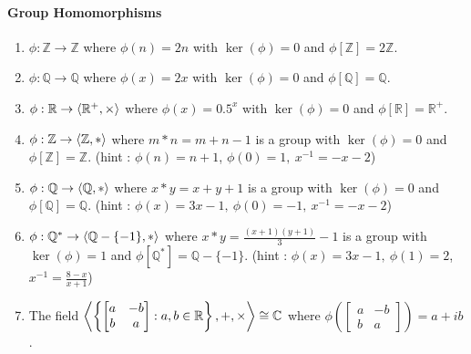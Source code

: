 \paragraph{Group Homomorphisms}
\begin{enumerate}
	\item $\phi : \mathbb{Z} \to \mathbb{Z}$ where $\phi(n)=2n$ with $\ker(\phi) = 0$ and $\phi[\mathbb{Z}] = 2\mathbb{Z}$.
	\item $\phi : \mathbb{Q} \to \mathbb{Q}$ where $\phi(x)=2x$ with $\ker(\phi) = 0$ and $\phi[\mathbb{Q}] = \mathbb{Q}$.
	\item $\phi : \mathbb{R} \to \left\langle \mathbb{R}^+,\times \right\rangle$ where $\phi(x)=0.5^x$ with $\ker(\phi) = 0$ and $\phi[\mathbb{R}] = \mathbb{R}^+$.
	\item $\phi : \mathbb{Z} \to \left\langle \mathbb{Z},\ast \right\rangle$ where $m \ast n = m+n-1 $ is a group with $\ker(\phi) = 0$ and $\phi[\mathbb{Z}] = \mathbb{Z}$.
		(hint : $\phi(n) = n+1$, $\phi(0) = 1,\ x^{-1} = -x-2$)
	\item $\phi : \mathbb{Q} \to \left\langle \mathbb{Q},\ast \right\rangle$ where $x \ast y =  x+y+1$ is a group with $\ker(\phi) = 0$ and $\phi[\mathbb{Q}] = \mathbb{Q}$.
		(hint : $\phi(x) = 3x-1,\ \phi(0) = -1,\ x^{-1} = -x-2$)
	\item $\phi : \mathbb{Q}^\ast \to \left\langle \mathbb{Q}-\{-1\},\ast \right\rangle$ where $x \ast y =  \frac{(x+1)(y+1)}{3}-1$ is a group with $\ker(\phi) = 1$ and $\phi[\mathbb{Q}^\ast] = \mathbb{Q}-\{-1\}$.
		(hint : $\phi(x) = 3x-1,\ \phi(1)=2$,\ $x^{-1} = \frac{8-x}{x+1}$)
	\item The field $\left\langle \left\{\begin{bmatrix} a & -b \\ b & a \end{bmatrix} : a,b \in \mathbb{R} \right\},+,\times \right\rangle \cong \mathbb{C}$ where $\phi\left(\begin{bmatrix} a & -b \\ b & a \end{bmatrix}\right) = a+ib$.\\
\end{enumerate}

